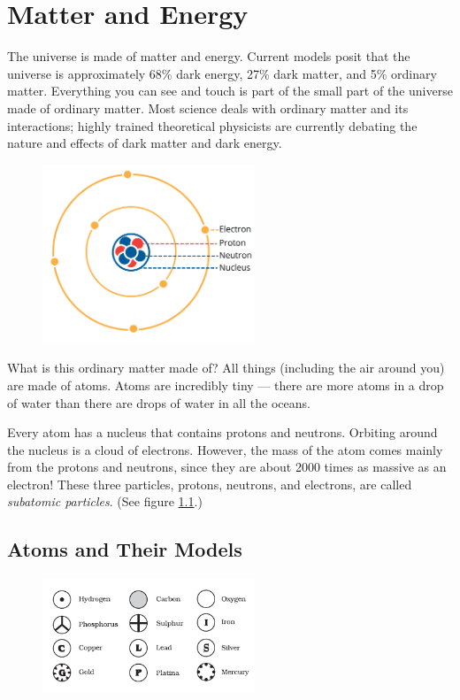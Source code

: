 \chapter{Matter and Energy}

The universe is made of matter and energy. Current models posit that the universe
is approximately 68\% dark energy, 27\% dark matter, and 5\% ordinary matter. 
Everything you can see and touch is part of the small part of the universe made 
of ordinary matter. Most science deals with ordinary matter and its interactions; 
highly trained theoretical physicists are currently debating the nature and 
effects of dark matter and dark energy. 
\begin{figure}
\noindent\includegraphics[width=2.5in]{atom1.png}
\caption{}
\label{fig:atom1}
\end{figure}

What is this ordinary matter made of? All things (including the air around you) 
are made of atoms. Atoms are incredibly tiny --- there are more atoms in a drop 
of water than there are drops of water in all the oceans.

Every atom has a nucleus that contains protons and neutrons. Orbiting around the
nucleus is a cloud of electrons. However, the mass of the atom comes mainly from 
the protons and neutrons, since they are about 2000 times as massive as an 
electron! These three particles, protons, neutrons, and electrons, are called
\textit{subatomic particles}. (See figure \ref{fig:atom1}.)  
  

\section{Atoms and Their Models}
\begin{figure}
\noindent\includegraphics[width=2.5in, trim={0 0.5cm 0 0.5cm}, clip=true]{daltons_model.png}
\caption{}
\end{figure}

